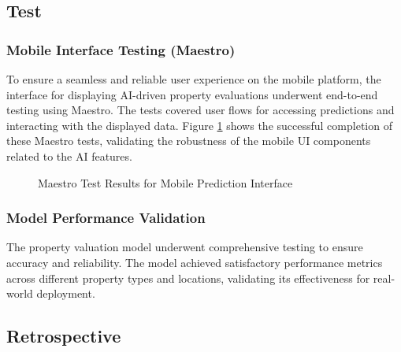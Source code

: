 \subsection{Test}
\subsubsection{Mobile Interface Testing (Maestro)}
To ensure a seamless and reliable user experience on the mobile platform, the interface for displaying AI-driven property evaluations underwent end-to-end testing using Maestro. The tests covered user flows for accessing predictions and interacting with the displayed data. Figure \ref{fig:maestro-tests-mobile} shows the successful completion of these Maestro tests, validating the robustness of the mobile UI components related to the AI features.

\begin{figure}[htbp]
    \centering
    \caption{Maestro Test Results for Mobile Prediction Interface}
    \label{fig:maestro-tests-mobile}
\end{figure}

\subsubsection{Model Performance Validation}
The property valuation model underwent comprehensive testing to ensure accuracy and reliability. The model achieved satisfactory performance metrics across different property types and locations, validating its effectiveness for real-world deployment.

\subsection{Retrospective}

